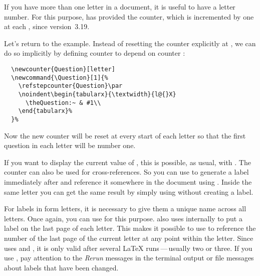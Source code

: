 \begin{Declaration}
\end{Declaration}
If you have more
than one letter in a document, it is useful to have a letter number. For this
purpose, \KOMAScript{} has provided the  counter, which
is incremented by one at each , since
version~3.19.
\begin{Example}
  Let's return to the 
  example. Instead of resetting the counter explicitly at
  , we can do so implicitly by defining
  counter  to depend on counter :
\begin{lstlisting}
  \newcounter{Question}[letter]
  \newcommand{\Question}[1]{%
    \refstepcounter{Question}\par
    \noindent\begin{tabularx}{\textwidth}{l@{}X}
      \theQuestion:~ & #1\\
    \end{tabularx}%
  }%
\end{lstlisting}
  Now the new counter will be reset at every start of each letter so that
  the first question in each letter will be number one.
\end{Example}

If you want to display the current value of , this is
possible, as usual, with . The counter can also be used for
cross-references. So you can use  to generate a
label immediately after  and reference it
somewhere in the document using . Inside the same
letter you can get the same result by simply using  without
creating a label.

For labels in form letters, it is necessary to give them a unique name across
all letters. Once again, you can use  for this purpose.
\KOMAScript{} also uses  internally to put a label on the
last page of each letter. This makes it possible to use
 to reference the
number of the last page of the current letter at any point within the letter.
Since  uses  and , it is
only valid after several \LaTeX{} runs\,---\,usually two or three. If you use
, pay attention to the \emph{Rerun} messages in the
terminal output or  file messages about labels that have been
changed.%
\EndIndexGroup



